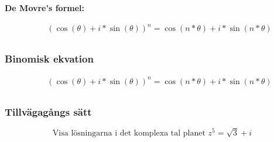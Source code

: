 \begin{multicols}{2}
\newpage

\textbf{De Movre's formel:}\par
\begin{align*}
  &\quad (\cos{(\theta)} + i * \sin{(\theta)})^{n} = \cos{(n*\theta)} + i * \sin{(n*\theta)} \\
\end{align*}


\subsubsection{Binomisk ekvation}
\begin{align*}
  &\quad (\cos{(\theta)} + i * \sin{(\theta)})^{n} = \cos{(n*\theta)} + i * \sin{(n*\theta)} \\
\end{align*}


\subsubsection{Tillvägagångs sätt}
\begin{equation}
  \text{Visa lösningarna i det komplexa tal planet } z^5 = \sqrt{3} + i
\end{equation}


\end{multicols}
